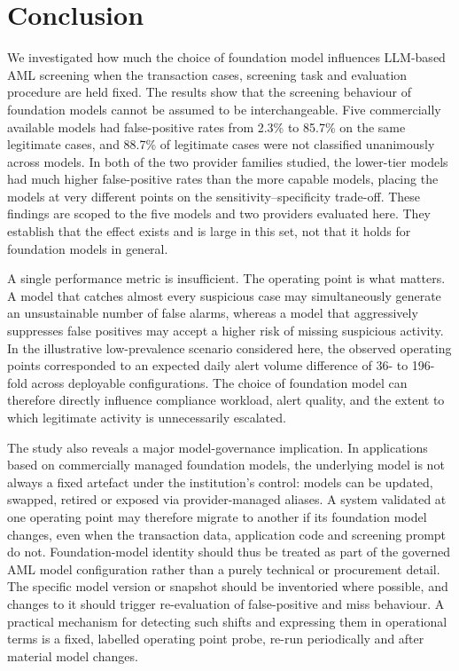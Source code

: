 \documentclass[pdflatex,sn-basic,Numbered]{sn-jnl}
\begin{document}
\section{Conclusion}\label{sec:conclusion}

We investigated how much the choice of foundation model influences LLM-based AML screening when the transaction cases, screening task and evaluation procedure are held fixed. The results show that the screening behaviour of foundation models cannot be assumed to be interchangeable. Five commercially available models had false-positive rates from 2.3\% to 85.7\% on the same legitimate cases, and 88.7\% of legitimate cases were not classified unanimously across models. In both of the two provider families studied, the lower-tier models had much higher false-positive rates than the more capable models, placing the models at very different points on the sensitivity--specificity trade-off. These findings are scoped to the five models and two providers evaluated here. They establish that the effect exists and is large in this set, not that it holds for foundation models in general.

A single performance metric is insufficient. The operating point is what matters. A model that catches almost every suspicious case may simultaneously generate an unsustainable number of false alarms, whereas a model that aggressively suppresses false positives may accept a higher risk of missing suspicious activity. In the illustrative low-prevalence scenario considered here, the observed operating points corresponded to an expected daily alert volume difference of 36- to 196-fold across deployable configurations. The choice of foundation model can therefore directly influence compliance workload, alert quality, and the extent to which legitimate activity is unnecessarily escalated.

The study also reveals a major model-governance implication. In applications based on commercially managed foundation models, the underlying model is not always a fixed artefact under the institution's control: models can be updated, swapped, retired or exposed via provider-managed aliases. A system validated at one operating point may therefore migrate to another if its foundation model changes, even when the transaction data, application code and screening prompt do not. Foundation-model identity should thus be treated as part of the governed AML model configuration rather than a purely technical or procurement detail. The specific model version or snapshot should be inventoried where possible, and changes to it should trigger re-evaluation of false-positive and miss behaviour. A practical mechanism for detecting such shifts and expressing them in operational terms is a fixed, labelled operating point probe, re-run periodically and after material model changes.
\end{document}
